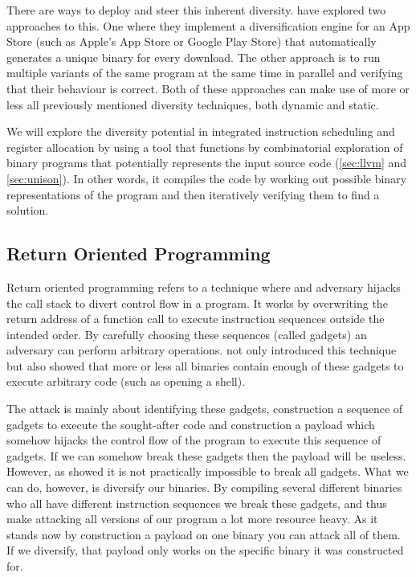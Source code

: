There are ways to deploy and steer this inherent diversity. \textcite{compiler-generated-sw-div}
have explored two approaches to this. One where they implement a diversification engine for
an App Store (such as Apple's App Store or Google Play Store) that automatically generates
a unique binary for every download. The other approach is to run multiple variants of the
same program at the same time in parallel and verifying that their behaviour is correct.
Both of these approaches can make use of more or less all previously mentioned diversity
techniques, both dynamic and static.

We will explore the diversity potential in integrated instruction scheduling and register
allocation by using a tool that functions by combinatorial exploration of binary programs
that potentially represents the input source code (\ref{sec:llvm} and \ref{sec:unison}).
In other words, it compiles the code by working out possible binary representations of the
program and then iteratively verifying them to find a solution.

\subsection{Return Oriented Programming}
Return oriented programming refers to a technique where and adversary hijacks the call 
stack to divert control flow in a program. It works by overwriting the return address of 
a function call to execute instruction sequences outside the intended order. By carefully
choosing these sequences (called gadgets) an adversary can perform arbitrary operations. 
\textcite{rop} not only introduced this technique but also showed that more or less all 
binaries contain enough of these gadgets to execute arbitrary code (such as opening a shell).

The attack is mainly about identifying these gadgets, construction a sequence of
gadgets to execute the sought-after code and construction a payload which somehow hijacks
the control flow of the program to execute this sequence of gadgets. If we can somehow
break these gadgets then the payload will be useless. However, as \textcite{rop} showed
it is not practically impossible to break all gadgets. What we can do, however, is diversify
our binaries. By compiling several different binaries who all have different instruction
sequences we break these gadgets, and thus make attacking all versions of our program
a lot more resource heavy. As it stands now by construction a payload on one binary you can
attack all of them. If we diversify, that payload only works on the specific binary it was
constructed for.

